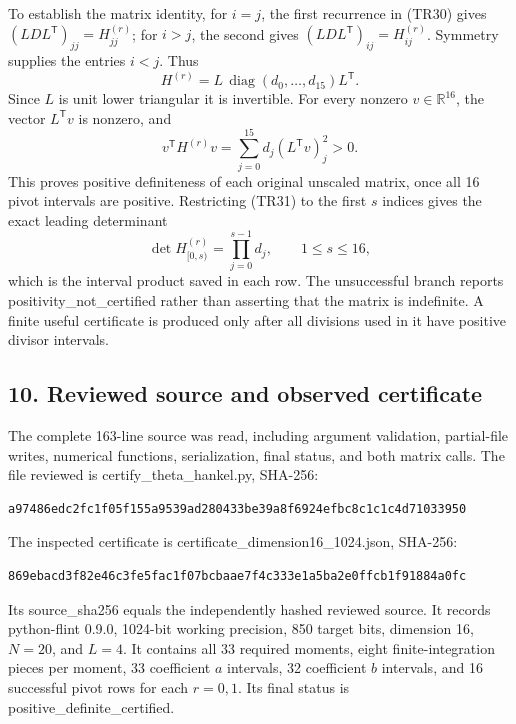 To establish the matrix identity, for \(i=j\), the first recurrence in (TR30) gives \((LDL^{\mathsf T})_{jj}=H^{(r)}_{jj}\); for \(i>j\), the second gives \((LDL^{\mathsf T})_{ij}=H^{(r)}_{ij}\). Symmetry supplies the entries \(i<j\). Thus \[
 H^{(r)}=L\,\operatorname{diag}(d_0,\ldots,d_{15})L^{\mathsf T}.
 \tag{TR31}
\] Since \(L\) is unit lower triangular it is invertible. For every nonzero \(v\in\mathbb R^{16}\), the vector \(L^{\mathsf T}v\) is nonzero, and \[
 v^{\mathsf T}H^{(r)}v
 =\sum_{j=0}^{15}d_j(L^{\mathsf T}v)_j^2>0.
 \tag{TR32}
\] This proves positive definiteness of each original unscaled matrix, once all 16 pivot intervals are positive. Restricting (TR31) to the first \(s\) indices gives the exact leading determinant \[
 \det H^{(r)}_{[0,s)}
 =\prod_{j=0}^{s-1}d_j,\qquad1\leq s\leq16,
 \tag{TR33}
\] which is the interval product saved in each row. The unsuccessful branch reports positivity\_not\_certified rather than asserting that the matrix is indefinite. A finite useful certificate is produced only after all divisions used in it have positive divisor intervals.

\subsection{10. Reviewed source and observed certificate}\label{reviewed-source-and-observed-certificate}

The complete 163-line source was read, including argument validation, partial-file writes, numerical functions, serialization, final status, and both matrix calls. The file reviewed is certify\_theta\_hankel.py, SHA-256:

\begin{lstlisting}
a97486edc2fc1f05f155a9539ad280433be39a8f6924efbc8c1c1c4d71033950
\end{lstlisting}

The inspected certificate is certificate\_dimension16\_1024.json, SHA-256:

\begin{lstlisting}
869ebacd3f82e46c3fe5fac1f07bcbaae7f4c333e1a5ba2e0ffcb1f91884a0fc
\end{lstlisting}

Its source\_sha256 equals the independently hashed reviewed source. It records python-flint 0.9.0, 1024-bit working precision, 850 target bits, dimension 16, \(N=20\), and \(L=4\). It contains all 33 required moments, eight finite-integration pieces per moment, 33 coefficient \(a\) intervals, 32 coefficient \(b\) intervals, and 16 successful pivot rows for each \(r=0,1\). Its final status is positive\_definite\_certified.

